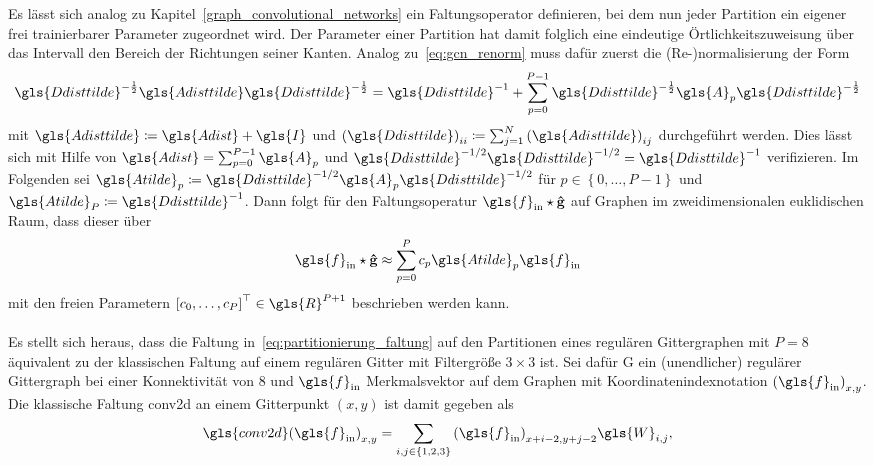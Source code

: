 Es lässt sich analog zu Kapitel~\ref{graph_convolutional_networks} ein Faltungsoperator definieren, bei dem nun jeder Partition ein eigener frei trainierbarer Parameter zugeordnet wird.
Der Parameter einer Partition hat damit folglich eine eindeutige Örtlichkeitszuweisung über das Intervall \bzw{} den Bereich der Richtungen seiner Kanten.
Analog zu~\eqref{eq:gcn_renorm} muss dafür zuerst die (Re-)normalisierung der Form
\begin{equation*}
  \gls{Ddisttilde}^{-\frac{1}{2}}\gls{Adisttilde}\gls{Ddisttilde}^{-\frac{1}{2}} = \gls{Ddisttilde}^{-1} + \sum_{p=0}^{P-1} \gls{Ddisttilde}^{-\frac{1}{2}}\gls{A}_p\gls{Ddisttilde}^{-\frac{1}{2}}
\end{equation*}
mit $\gls{Adisttilde} \coloneqq \gls{Adist} + \gls{I}$ und ${\left(\gls{Ddisttilde}\right)}_{ii} \coloneqq \sum_{j=1}^N {\left(\gls{Adisttilde}\right)}_{ij}$ durchgeführt werden.
Dies lässt sich mit Hilfe von $\gls{Adist} = \sum_{p=0}^{P-1} \gls{A}_p$ und $\gls{Ddisttilde}^{-1/2}\gls{Ddisttilde}^{-1/2} = \gls{Ddisttilde}^{-1}$ verifizieren.
Im Folgenden sei $\gls{Atilde}_p \coloneqq \gls{Ddisttilde}^{-1/2}\gls{A}_p\gls{Ddisttilde}^{-1/2}$ für $p \in \left\{0, \ldots, P-1 \right\}$ und $\gls{Atilde}_P \coloneqq \gls{Ddisttilde}^{-1}$.
Dann folgt für den Faltungsoperatur $\gls{f}_{\mathrm{in}} \star \ve{\hat g}$ auf Graphen im zweidimensionalen euklidischen Raum, dass dieser über
\begin{equation}
  \gls{f}_{\mathrm{in}} \star \ve{\hat g} \approx \sum_{p=0}^P c_p \gls{Atilde}_p \gls{f}_{\mathrm{in}}
  \label{eq:partitionierung_faltung}
\end{equation}
mit den freien Parametern ${\left[c_0, \ldots, c_P\right]}^{\top} \in \gls{R}^{P+1}$ beschrieben werden kann.
\\\\
Es stellt sich heraus, dass die Faltung in~\eqref{eq:partitionierung_faltung} auf den Partitionen eines regulären Gittergraphen mit $P=8$ äquivalent zu der klassischen Faltung auf einem regulären Gitter mit Filtergröße $3 \times 3$ ist.
Sei dafür \gls{G} ein (unendlicher) regulärer Gittergraph bei einer Konnektivität von $8$ und $\gls{f}_{\mathrm{in}}$ Merkmalsvektor auf dem Graphen mit Koordinatenindexnotation ${\left(\gls{f}_{\mathrm{in}}\right)}_{x,y}$.
  Die klassische Faltung \gls{conv2d} an einem Gitterpunkt $\left(x, y\right)$ ist damit gegeben als
\begin{equation*}
  {\gls{conv2d}\left({\gls{f}_{\mathrm{in}}}\right)}_{x,y} = \sum_{i,j \in \left\{1, 2, 3\right\}} {\left(\gls{f}_{\mathrm{in}}\right)}_{x+i-2, y+j-2} \gls{W}_{i, j},
\end{equation*}
